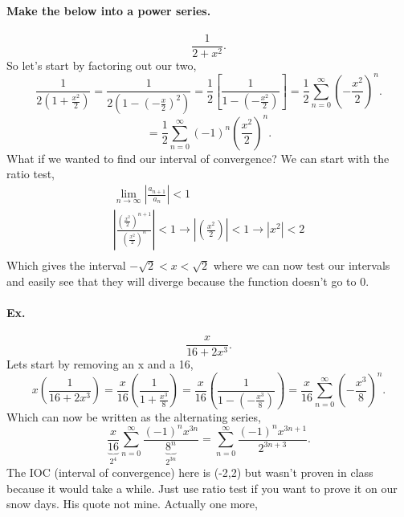 \paragraph{Make the below into a power series.}
\[
\frac{ 1 }{ 2+x^2 } 
.\] 
So let's start by factoring out our two,
\[
\frac{ 1 }{ 2\left( 1+\frac{ x^2 }{ 2 } \right)  } = \frac{ 1 }{ 2\left( 1-\left( -\frac{ x }{ 2 }  \right) ^2 \right)  } = \frac{ 1 }{ 2 } \left[ \frac{ 1 }{ 1-\left( -\frac{ x^2 }{ 2 }  \right)  }  \right] = \frac{ 1 }{ 2 } \sum_{ n=0 } ^{ \infty } \left( -\frac{ x^2 }{ 2 }  \right)^{ n } 
.\] 
\[
= \frac{ 1 }{ 2 } \sum_{ n=0 } ^{ \infty } \left( -1 \right) ^{ n }\left( \frac{ x^2 }{ 2}  \right) ^{ n }
.\] 
What if we wanted to find our interval of convergence? We can start with the ratio test,
\begin{gather*}
\lim_{ n \to \infty} \left| \frac{ a_{ n+1 } }{ a_n } \right| < 1\\
\left| \frac{ \left( \frac{ x^2 }{ 2 }  \right) ^{ n+1 } }{ \left( \frac{ x^2 }{ 2 }  \right) ^{ n } } \right|<1 \to \left| \left( \frac{ x^2 }{ 2 }  \right)  \right|<1 \to \left| x^2 \right|<2\\
\end{gather*}
Which gives the interval $ -\sqrt{ 2}<x<\sqrt{ 2} $ where we can now test our intervals and easily see that they will diverge because the function doesn't go to 0. 
\paragraph{Ex.}
\[
\frac{ x }{ 16+2x^3 } 
.\] 
Lets start by removing an x and a 16,
\[
x\left( \frac{ 1 }{ 16+2x^3 }  \right) =\frac{ x }{ 16 } \left( \frac{ 1 }{ 1+\frac{ x^3 }{ 8 }  }  \right) = \frac{ x }{ 16 } \left( \frac{ 1 }{ 1-\left( -\frac{ x^3 }{ 8 }  \right)  }  \right) = \frac{ x }{ 16 } \sum_{ n=0 } ^{ \infty } \left( -\frac{ x^3 }{ 8 }  \right) ^{ n }
.\] 
Which can now be written as the alternating series,
\[
\frac{ x }{ \underbrace{ 16 }_{ 2^{ 4 } }  } \sum_{ n=0 } ^{ \infty } \frac{ \left( -1 \right) ^{ n }x^{ 3n } }{ \underbrace{ 8^{ n } }_{ 2^{ 3n } }  } = \sum_{ n=0 } ^{ \infty } \frac{ \left( -1 \right) ^{ n } x^{ 3n+1 }}{ 2^{ 3n+3 } }
.\] 
The IOC (interval of convergence) here is (-2,2) but wasn't proven in class because it would take a while. Just use ratio test if you want to prove it on our snow days. His quote not mine. Actually one more,\\
